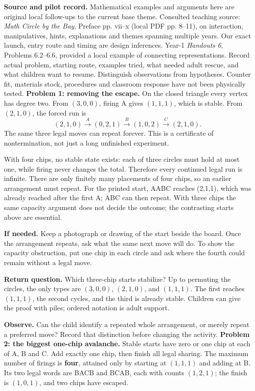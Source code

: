 \documentclass[11pt]{article}
\begin{document}
\textbf{Source and pilot record.} Mathematical examples and arguments here are original local follow-ups to the current base theme. Consulted teaching source: \emph{Math Circle by the Bay}, Preface pp. vii--x (local PDF pp. 8--11), on interaction, manipulatives, hints, explanations and themes spanning multiple years. Our exact launch, entry route and timing are design inferences. Year-1 \emph{Handouts 6}, Problems 6.2--6.6, provided a local example of connecting representations. Record actual problem, starting route, examples tried, what needed adult rescue, and what children want to resume. Distinguish observations from hypotheses. Counter fit, materials stock, procedures and classroom response have not been physically tested.
\newpage
\textbf{Problem 1: removing the escape.} On the closed triangle every vertex has degree two. From \((3,0,0)\), firing A gives \((1,1,1)\), which is stable. From \((2,1,0)\), the forced run is
\[
(2,1,0)\xrightarrow{A}(0,2,1)\xrightarrow{B}(1,0,2)\xrightarrow{C}(2,1,0).
\]
The same three legal moves can repeat forever. This is a certificate of nontermination, not just a long unfinished experiment.

With four chips, no stable state exists: each of three circles must hold at most one, while firing never changes the total. Therefore every continued legal run is infinite. There are only finitely many placements of four chips, so an earlier arrangement must repeat. For the printed start, AABC reaches (2,1,1), which was already reached after the first A; ABC can then repeat. With three chips the same capacity argument does not decide the outcome; the contrasting starts above are essential.

\textbf{If needed.} Keep a photograph or drawing of the start beside the board. Once the arrangement repeats, ask what the same next move will do. To show the capacity obstruction, put one chip in each circle and ask where the fourth could remain without a legal move.

\textbf{Return question.} Which three-chip starts stabilize? Up to permuting the circles, the only types are \((3,0,0)\), \((2,1,0)\), and \((1,1,1)\). The first reaches \((1,1,1)\), the second cycles, and the third is already stable. Children can give the proof with piles; ordered notation is adult support.

\textbf{Observe.} Can the child identify a repeated whole arrangement, or merely repeat a preferred move? Record that distinction before changing the activity.
\newpage
\textbf{Problem 2: the biggest one-chip avalanche.} Stable starts have zero or one chip at each of A, B and C. Add exactly one chip, then finish all legal sharing. The maximum number of firings is \textbf{four}, attained only by starting at \((1,1,1)\) and adding at B. Its two legal words are BACB and BCAB, each with counts \((1,2,1)\); the finish is \((1,0,1)\), and two chips have escaped.
\end{document}
